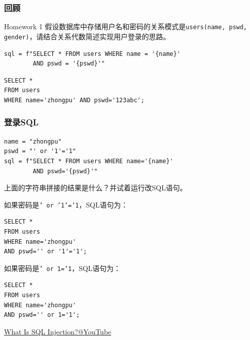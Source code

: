 \documentclass[aspectratio=169, 14pt]{beamer}
\begin{document}
\begin{frame}[fragile]
    \frametitle{回顾}
\begin{exampleblock}{Homework 1}
假设数据库中存储用户名和密码的关系模式是\texttt{users(name, pswd, gender)}，请结合关系代数简述实现用户登录的思路。
\end{exampleblock}

\begin{verbatim}
sql = f"SELECT * FROM users WHERE name = '{name}'
        AND pswd = '{pswd}'"
\end{verbatim}

\begin{verbatim}
SELECT *
FROM users
WHERE name='zhongpu' AND pswd='123abc';
\end{verbatim}

\end{frame}

\begin{frame}[fragile]
    \frametitle{登录SQL}

    \begin{verbatim}
name = "zhongpu"
pswd = "' or '1'='1"
sql = f"SELECT * FROM users WHERE name='{name}'
        AND pswd='{pswd}'"
    \end{verbatim}  

 上面的字符串拼接的结果是什么？并试着运行改SQL语句。
\end{frame}

\begin{frame}[fragile]

如果密码是\alert{\texttt{' or '1'='1}}，SQL语句为：

\begin{verbatim}
SELECT * 
FROM users 
WHERE name='zhongpu' 
AND pswd='' or '1'='1';
\end{verbatim}

\pause
如果密码是\alert{\texttt{' or 1='1}}，SQL语句为：

\begin{verbatim}
SELECT *
FROM users
WHERE name='zhongpu'
AND pswd='' or 1='1';
\end{verbatim}

\end{frame}

\begin{frame}
\href{https://www.youtube.com/watch?v=wcaiKgQU6VE}{What Is SQL Injection?@YouTube}
    

\end{frame}
\end{document}
